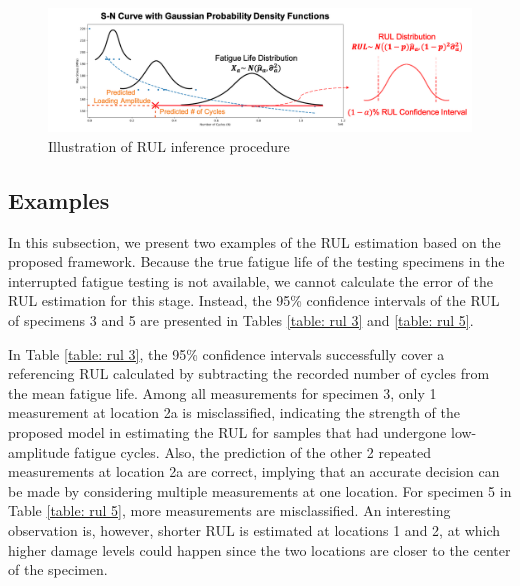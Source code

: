 \begin{figure}[tb]
    \includegraphics[width=\linewidth]{fig/rul_inference_procedure.png}
    \caption{Illustration of RUL inference procedure}
    \label{fig: rul infer procedure}
\end{figure}

\subsection{Examples}

In this subsection, we present two examples of the RUL estimation based on the proposed framework. Because the true fatigue life of the testing specimens in the interrupted fatigue testing is not available, we cannot calculate the error of the RUL estimation for this stage. Instead, the 95\% confidence intervals of the RUL of specimens 3 and 5 are presented in Tables \ref{table: rul 3} and \ref{table: rul 5}. 

In Table \ref{table: rul 3}, the 95\% confidence intervals successfully cover a referencing RUL calculated by subtracting the recorded number of cycles from the mean fatigue life. Among all measurements for specimen 3, only 1 measurement at location 2a is misclassified, indicating the strength of the proposed model in estimating the RUL for samples that had undergone low-amplitude fatigue cycles. Also, the prediction of the other 2 repeated measurements at location 2a are correct, implying that an accurate decision can be made by considering multiple measurements at one location. For specimen 5 in Table \ref{table: rul 5}, more measurements are misclassified. An interesting observation is, however, shorter RUL is estimated at locations 1 and 2, at which higher damage levels could happen since the two locations are closer to the center of the specimen. 

